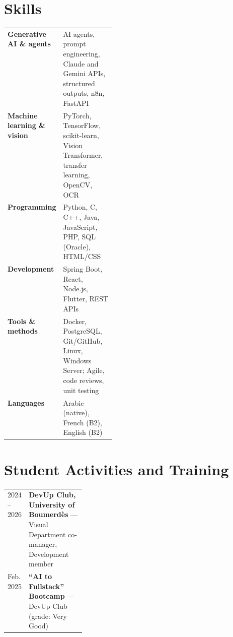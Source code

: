 \documentclass[a4paper,10pt]{article}
\begin{document}
\section{Skills}
\begin{tabularx}{\linewidth}{@{}>{\bfseries}p{0.25\linewidth} X@{}}
Generative AI \& agents & AI agents, prompt engineering, Claude and Gemini APIs, structured outputs, n8n, FastAPI \\
Machine learning \& vision & PyTorch, TensorFlow, scikit-learn, Vision Transformer, transfer learning, OpenCV, OCR \\
Programming & Python, C, C++, Java, JavaScript, PHP, SQL (Oracle), HTML/CSS \\
Development & Spring Boot, React, Node.js, Flutter, REST APIs \\
Tools \& methods & Docker, PostgreSQL, Git/GitHub, Linux, Windows Server; Agile, code reviews, unit testing \\
Languages & Arabic (native), French (B2), English (B2) \\
\end{tabularx}

\section{Student Activities and Training}
\begin{tabularx}{\linewidth}{@{}p{0.18\linewidth} X@{}}
2024 -- 2026 & \textbf{DevUp Club, University of Boumerdès} — Visual Department co-manager, Development member \\
Feb. 2025 & \textbf{``AI to Fullstack'' Bootcamp} — DevUp Club (grade: Very Good) \\
\end{tabularx}
\end{document}
